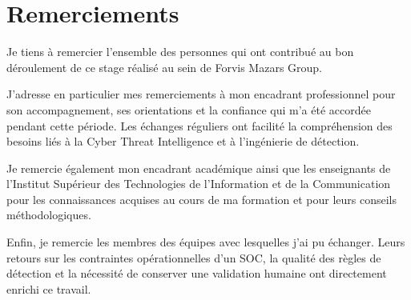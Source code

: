 \chapter*{Remerciements}

Je tiens à remercier l'ensemble des personnes qui ont contribué au bon déroulement de ce stage réalisé au sein de Forvis Mazars Group.

J'adresse en particulier mes remerciements à mon encadrant professionnel pour son accompagnement, ses orientations et la confiance qui m'a été accordée pendant cette période. Les échanges réguliers ont facilité la compréhension des besoins liés à la Cyber Threat Intelligence et à l'ingénierie de détection.

Je remercie également mon encadrant académique ainsi que les enseignants de l'Institut Supérieur des Technologies de l'Information et de la Communication pour les connaissances acquises au cours de ma formation et pour leurs conseils méthodologiques.

Enfin, je remercie les membres des équipes avec lesquelles j'ai pu échanger. Leurs retours sur les contraintes opérationnelles d'un SOC, la qualité des règles de détection et la nécessité de conserver une validation humaine ont directement enrichi ce travail.